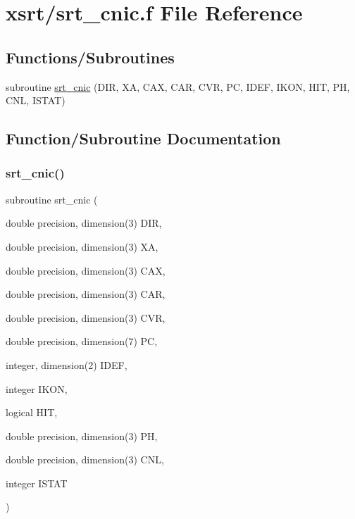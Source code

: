 \hypertarget{srt__cnic_8f}{}\section{xsrt/srt\+\_\+cnic.f File Reference}
\label{srt__cnic_8f}
\subsection*{Functions/\+Subroutines}
\begin{DoxyCompactItemize}
\item 
subroutine \hyperlink{srt__cnic_8f_a18d188f79fc77e80d8ea3cc7de00d3e2}{srt\+\_\+cnic} (D\+IR, XA, C\+AX, C\+AR, C\+VR, PC, I\+D\+EF, I\+K\+ON, H\+IT, PH, C\+NL, I\+S\+T\+AT)
\end{DoxyCompactItemize}


\subsection{Function/\+Subroutine Documentation}
\mbox{\label{srt__cnic_8f_a18d188f79fc77e80d8ea3cc7de00d3e2}} 
\subsubsection{\texorpdfstring{srt\+\_\+cnic()}{srt\_cnic()}}
{\footnotesize\ttfamily subroutine srt\+\_\+cnic (\begin{DoxyParamCaption}\item[{double precision, dimension(3)}]{D\+IR,  }\item[{double precision, dimension(3)}]{XA,  }\item[{double precision, dimension(3)}]{C\+AX,  }\item[{double precision, dimension(3)}]{C\+AR,  }\item[{double precision, dimension(3)}]{C\+VR,  }\item[{double precision, dimension(7)}]{PC,  }\item[{integer, dimension(2)}]{I\+D\+EF,  }\item[{integer}]{I\+K\+ON,  }\item[{logical}]{H\+IT,  }\item[{double precision, dimension(3)}]{PH,  }\item[{double precision, dimension(3)}]{C\+NL,  }\item[{integer}]{I\+S\+T\+AT }\end{DoxyParamCaption})}

